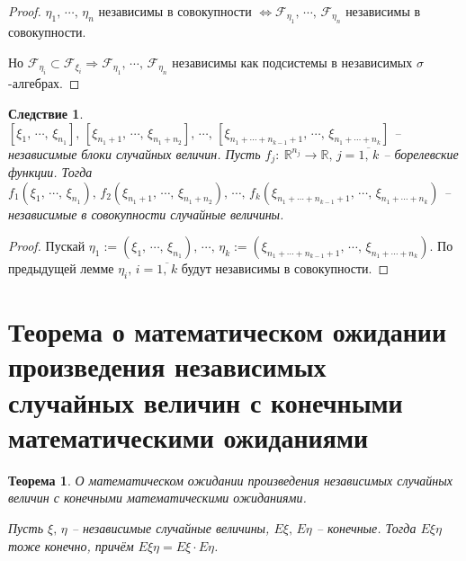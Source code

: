 \documentclass[a4paper,12pt]{article}
\theoremstyle{plain}
\newtheorem{theorem}{Теорема}[section]
\newtheorem*{corollary}{Следствие}
\theoremstyle{definition}
\theoremstyle{remark}
\begin{document}
\begin{proof}
  $\eta_1,\,\cdots,\,\eta_n$ независимы в совокупности $\Leftrightarrow \mathcal{F}_{\eta_1},\,\cdots,\,\mathcal{F}_{\eta_n}$ независимы в совокупности.

  Но $\mathcal{F}_{\eta_i} \subset \mathcal{F}_{\xi_i} \Rightarrow \mathcal{F}_{\eta_1},\,\cdots,\,\mathcal{F}_{\eta_n}$ независимы как подсистемы в независимых $\sigma$-алгебрах.
\end{proof}

\begin{corollary}
  $[\xi_1,\,\cdots,\,\xi_{n_1}],\, [\xi_{n_1 + 1},\,\cdots,\,\xi_{n_1 + n_2}],\,\cdots,\, [\xi_{n_1 + \cdots + n_{k - 1} + 1},\,\cdots,\, \xi_{n_1 + \cdots + n_k}]$ -- независимые блоки случайных величин. Пусть $f_j :\: \mathbb{R}^{n_j} \to \mathbb{R},\, j = \overline{1,\,k}$ -- борелевские функции. Тогда $f_1(\xi_1,\,\cdots,\,\xi_{n_1}),\, f_2(\xi_{n_1 + 1},\,\cdots,\,\xi_{n_1 + n_2}),\,\cdots,\, f_k(\xi_{n_1 + \cdots + n_{k - 1} + 1},\,\cdots,\, \xi_{n_1 + \cdots + n_k})$ -- независимые в совокупности случайные величины.
\end{corollary}

\begin{proof}
  Пускай $\eta_1 := (\xi_1,\,\cdots,\,\xi_{n_1}),\, \cdots,\, \eta_k := (\xi_{n_1 + \cdots + n_{k - 1} + 1},\,\cdots,\, \xi_{n_1 + \cdots + n_k})$. По предыдущей лемме $\eta_i,\, i = \overline{1,\,k}$ будут независимы в совокупности.
\end{proof}

\section{Теорема о математическом ожидании произведения независимых случайных величин с конечными математическими ожиданиями}
\begin{theorem}
  О математическом ожидании произведения независимых случайных величин с конечными математическими ожиданиями.

  Пусть $\xi,\, \eta$ -- независимые случайные величины, $E\xi,\, E\eta$ -- конечные. Тогда $E\xi\eta$ тоже конечно, причём $E\xi\eta = E\xi\cdot E\eta$.
\end{theorem}
\end{document}
